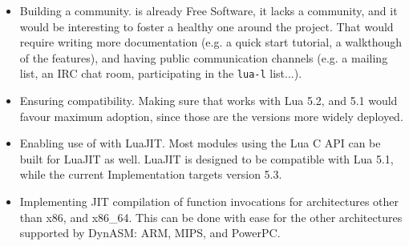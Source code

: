 \begin{itemize}

	\item Building a community. \Eol* is already Free Software, it lacks
	a community, and it would be interesting to foster a healthy one around
	the project. That would require writing more documentation (e.g. a quick
	start tutorial, a walkthough of the features), and having public
	communication channels (e.g. a mailing list, an \gls{IRC} chat room,
	participating in the \verb|lua-l| list...).

	\item Ensuring compatibility. Making sure that \Eol* works with Lua 5.2,
	and	5.1 would favour maximum adoption, since those are the versions more
	widely deployed.

	\item Enabling use of \Eol* with LuaJIT. Most modules using the Lua C API
	can be built for LuaJIT as well. LuaJIT is designed to be compatible with
	Lua	5.1, while the current Implementation targets version 5.3.

	\item Implementing JIT compilation of function invocations for
	architectures other than x86, and x86\_64. This can be done with ease for
	the other architectures supported by DynASM: ARM, MIPS, and PowerPC.

\end{itemize}

\beforeintro
